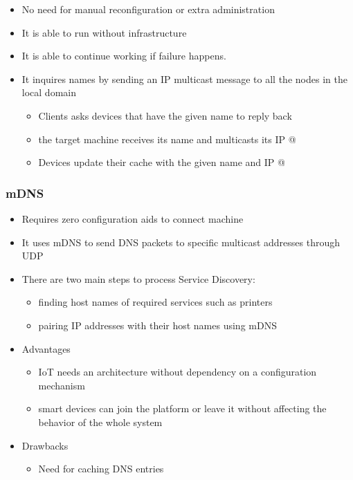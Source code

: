 \begin{itemize}
	\item No need for manual reconfiguration or extra administration
	\item It is able to run without infrastructure
	\item It is able to continue working if failure happens.
	\item It inquires names by sending an IP multicast message to all the nodes in the local domain
	\begin{itemize}
		\item Clients asks devices that have the given name to reply back
		\item the target machine receives its name and multicasts its IP @
		\item Devices update their cache with the given name and IP @
	\end{itemize}
\end{itemize}

\subsubsection{mDNS}

\begin{itemize}
	\item Requires zero configuration aids to connect machine
	\item It uses mDNS to send DNS packets to specific multicast addresses through UDP
	\item There are two main steps to process Service Discovery:
	\begin{itemize}
		\item finding host names of required services such as printers
		\item pairing IP addresses with their host names using mDNS
	\end{itemize}
	\item Advantages
	\begin{itemize}
		\item IoT needs an architecture without dependency on a configuration mechanism
		\item smart devices can join the platform or leave it without affecting the behavior of the whole system
	\end{itemize}
	\item Drawbacks
	\begin{itemize}
		\item Need for caching DNS entries
	\end{itemize}
\end{itemize}


